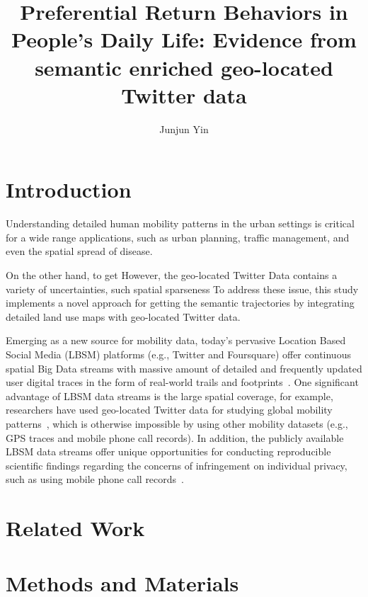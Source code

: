 \documentclass[fleqn,10pt]{wlscirep}
\title{Preferential Return Behaviors in People's Daily Life: Evidence from semantic enriched geo-located Twitter data}
\author[1,+]{Junjun  Yin}
\affil[1]{Population Research Institute}
\affil[ ]{The Pennslyvania State University, State College, PA, 16801, USA}
\affil[+]{these authors contributed equally to this work}
\begin{document}
\flushbottom
\maketitle


\section*{Introduction}
Understanding detailed human mobility patterns in the urban settings is critical for a wide range applications, such as urban planning, traffic management, and even the spatial spread of disease.

On the other hand, to get 
However, the geo-located Twitter Data contains a variety of uncertainties, such spatial sparseness
To address these issue, this study implements a novel approach for getting the semantic trajectories by integrating detailed land use maps with geo-located Twitter data.

Emerging as a new source for mobility data, today's pervasive Location Based Social Media (LBSM) platforms (e.g., Twitter and Foursquare) offer continuous spatial Big Data streams with massive amount of detailed and frequently updated user digital traces in the form of real-world trails and footprints~\cite{thatcher2014}.
One significant advantage of LBSM data streams is the large spatial coverage, for example, researchers have used geo-located Twitter data for studying global mobility patterns~\cite{hawelka2014geo}, which is otherwise impossible by using other mobility datasets (e.g., GPS traces and mobile phone call records). 
In addition, the publicly available LBSM data streams offer unique opportunities for conducting reproducible scientific findings regarding the concerns of infringement on individual privacy, such as using mobile phone call records~\cite{giannotti2008mobility,crampton2014collect,Jurdak2015}.


\section*{Related Work}

\section*{Methods and Materials}
\end{document}

